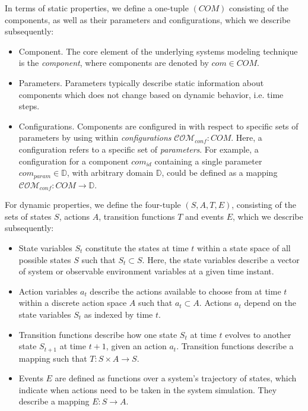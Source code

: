 \documentclass[a4paper,twoside]{article}
\begin{document}
	In terms of static properties, we define a one-tuple $(COM)$ consisting of the components, as well as their parameters and configurations, which we describe subsequently:
	\begin{itemize}
		\item Component. The core element of the underlying systems modeling technique is the \textit{component}, where components are denoted by $com \in COM$. 
		\item Parameters. Parameters typically describe static information about components which does not change based on dynamic behavior, i.e. time steps.
		\item Configurations. Components are configured in with respect to specific sets of parameters by using within \textit{configurations} $\mathcal{COM}_{conf}: COM$. Here, a configuration refers to a specific set of \textit{parameters}. For example, a configuration for a component $com_{id}$ containing a single parameter $com_{param} \in \mathbb{D}$, with arbitrary domain $\mathbb{D}$, could be defined as a mapping $\mathcal{COM}_{conf}: COM \rightarrow \mathbb{D}$.
		
		
	\end{itemize}
	
	
	For dynamic properties, we define the four-tuple $(S, A, T, E)$, consisting of the sets of states $S$, actions $A$, transition functions $T$ and events $E$, which we describe subsequently:	
	\begin{itemize}
		\item State variables $S_t$ constitute the states at time $t$ within a state space of all possible states $S$ such that $S_t \subset S$. Here, the state variables describe a vector of system or observable environment variables at a given time instant. 
		\item Action variables $a_t$ describe the actions available to choose from at time $t$ within a discrete action space $A$ such that $a_t \subset A$. Actions $a_t$ depend on the state variables $S_t$ as indexed by time $t$.
		\item Transition functions describe how one state $S_t$ at time $t$ evolves to another state $S_{t+1}$ at time $t+1$, given an action $a_t$. Transition functions describe a mapping such that $T : S \times A \to S$. 
		\item Events $E$ are defined as functions over a system's trajectory of states, which indicate when actions need to be taken in the system simulation. They describe a mapping $E : S \to A$. 
	\end{itemize}
	
\end{document}
